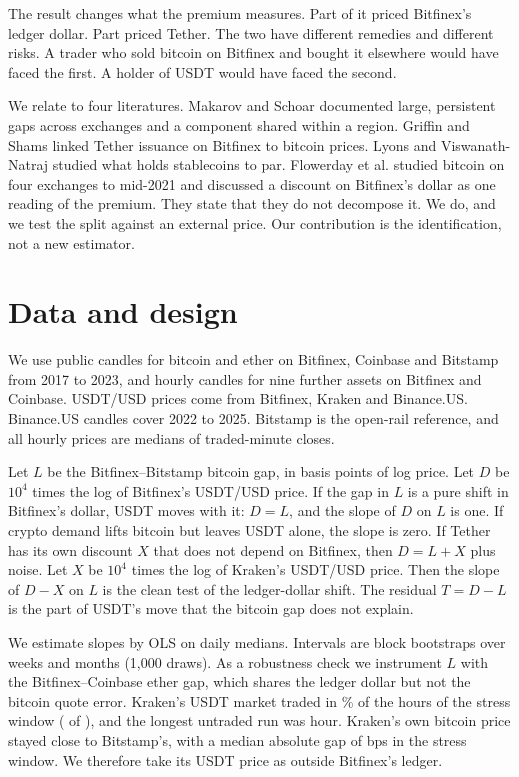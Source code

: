 \documentclass[preprint,10pt]{elsarticle}
\begin{document}
The result changes what the premium measures. Part of it priced Bitfinex's ledger dollar. Part priced Tether. The two have different remedies and different risks. A trader who sold bitcoin on Bitfinex and bought it elsewhere would have faced the first. A holder of USDT would have faced the second.

We relate to four literatures. Makarov and Schoar \citep{makarov2020trading} documented large, persistent gaps across exchanges and a component shared within a region. Griffin and Shams \citep{griffin2020untethered} linked Tether issuance on Bitfinex to bitcoin prices. Lyons and Viswanath-Natraj \citep{lyons2023keeps} studied what holds stablecoins to par. Flowerday et al. \citep{flowerday2026bitcoin} studied bitcoin on four exchanges to mid-2021 and discussed a discount on Bitfinex's dollar as one reading of the premium. They state that they do not decompose it. We do, and we test the split against an external price. Our contribution is the identification, not a new estimator.

\section{Data and design}
We use public candles for bitcoin and ether on Bitfinex, Coinbase and Bitstamp from 2017 to 2023, and hourly candles for nine further assets on Bitfinex and Coinbase. USDT/USD prices come from Bitfinex, Kraken and Binance.US. Binance.US candles cover 2022 to 2025. Bitstamp is the open-rail reference, and all hourly prices are medians of traded-minute closes.

Let $L$ be the Bitfinex--Bitstamp bitcoin gap, in basis points of log price. Let $D$ be $10^4$ times the log of Bitfinex's USDT/USD price. If the gap in $L$ is a pure shift in Bitfinex's dollar, USDT moves with it: $D=L$, and the slope of $D$ on $L$ is one. If crypto demand lifts bitcoin but leaves USDT alone, the slope is zero. If Tether has its own discount $X$ that does not depend on Bitfinex, then $D=L+X$ plus noise. Let $X$ be $10^4$ times the log of Kraken's USDT/USD price. Then the slope of $D-X$ on $L$ is the clean test of the ledger-dollar shift. The residual $T=D-L$ is the part of USDT's move that the bitcoin gap does not explain.

We estimate slopes by OLS on daily medians. Intervals are block bootstraps over weeks and months (1,000 draws). As a robustness check we instrument $L$ with the Bitfinex--Coinbase ether gap, which shares the ledger dollar but not the bitcoin quote error. Kraken's USDT market traded in \NumKCovSharePct\% of the hours of the stress window (\NumKCovTraded{} of \NumKCovHours{}), and the longest untraded run was \NumKCovLongestGap{} hour. Kraken's own bitcoin price stayed close to Bitstamp's, with a median absolute gap of \NumKStressKrakenBtcGapMedAbs{} bps in the stress window. We therefore take its USDT price as outside Bitfinex's ledger.
\end{document}
